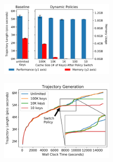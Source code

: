 \begin{figure}[tb]
  \noindent\includegraphics[width=0.5\textwidth]{figures/keyspace-analysis_cachesize-dynamic.png}\\
  \caption{\label{fig:keyspace-analysis_cachesize-dynamic}}
\end{figure}
\begin{figure}[tb]
  \noindent\includegraphics[width=0.5\textwidth]{figures/keyspace-analysis_cachesize-caveats.png}\\
  \caption{\label{fig:keyspace-analysis_cachesize-caveats}}
\end{figure}

